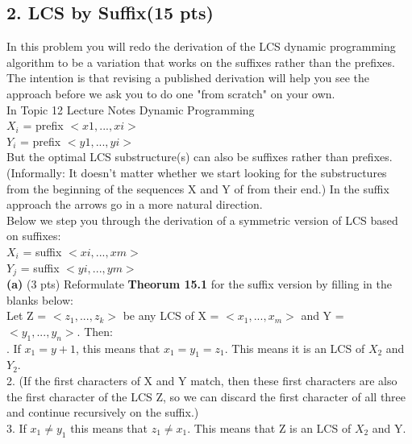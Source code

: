 \documentclass[12pt]{article}
\begin{document}
\subsection*{2. LCS by Suffix(15 pts)}
\linebreak
In this problem you will redo the derivation of the LCS dynamic programming algorithm to be a variation that works on the suffixes rather than the prefixes. The intention is that revising a published derivation will help you see the approach before we ask you to do one "from scratch" on your own. \\
\linebreak
In Topic 12 Lecture Notes Dynamic Programming \\
$X_i$ = prefix $<x1,...,xi>$\\
$Y_i$ = prefix $<y1,...,yi>$\\
\linebreak
But the optimal LCS substructure(s) can also be suffixes rather than prefixes. (Informally: It doesn't matter whether we start looking for the substructures from the beginning of the sequences X and Y of from their end.) In the suffix approach the arrows go in a more natural direction. \\
\linebreak
Below we step you through the derivation of a symmetric version of LCS based on suffixes: \\
\linebreak
$X_i$ = suffix $<xi,...,xm>$\\
$Y_j$ = suffix $<yi,...,ym>$\\
\linebreak
\textbf{(a)} (3 pts) Reformulate \textbf{Theorum 15.1} for the suffix version by filling in the blanks below: \\
\linebreak
Let Z = $<z_1,...,z_k>$ be any LCS of X = $<x_1,...,x_m>$ and Y = $<y_1,...,y_n>$. Then: \\
. If $x_1 = y+1$, this means that $x_1 = y_1 = z_1$. This means it is an LCS of $X_2$ and $Y_2$. \\
2. (If the first characters of X and Y match, then these first characters are also the first character of the LCS Z, so we can discard the first character of all three and continue recursively on the suffix.) \\
3. If $x_1 \neq y_1$ this means that $z_1 \neq x_1$. This means that Z is an LCS of $X_2$ and Y. \\
\end{document}
